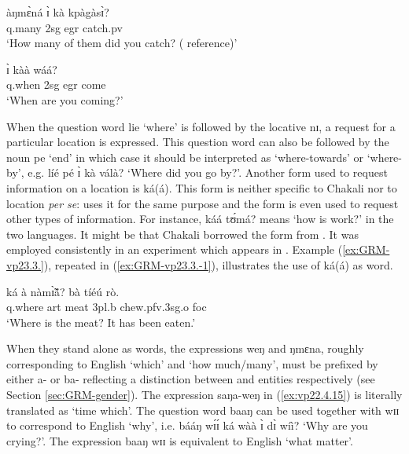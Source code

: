 \begin{exe}
\begin{exe}
\begin{exe}
\begin{exe}
\begin{exe}
\begin{exe}
\begin{exe}
\begin{exe}
\begin{exe}
\ex\label{ex:vp22.4.10}
\gll àŋmɛ̀ná ɪ̀ kà kpàgàsɪ̀?\\
   {\sc q}.many {\sc 2sg}  {\sc  egr}  catch.{\sc pv}\\
\glt  `How many of them did you catch? ( reference)' 

\ex\label{ex:vp22.4.15}
 ɪ̀ kàà wáá?\\
    {\sc q}.when {\sc 2sg} {\sc  egr} come\\
\glt  `When are you coming?' 
  
   
  \z 
 \z

When the question word {\sls lie} `where' is  followed by the locative  {\sls nɪ},  a request for a particular location is expressed. This question word can also be followed by the noun  {\sls pe} `end' in which case it should be interpreted as `where-towards' or `where-by', e.g. {\sls líé pé ɪ̀ kà válà?} `Where did you go by?'.  Another form used to request information on a location is {\sls ká(á)}. This form is neither specific to Chakali nor to location {\it per se}:   uses it for the same purpose and the form is even used to request other types  of information. For instance, {\sls káá tʊ́má?} means `how is work?' in the two languages. It might be that Chakali borrowed the form from .  It was employed consistently in an experiment which appears in \citet{brin11}. Example  (\ref{ex:GRM-vp23.3.}),  repeated in  (\ref{ex:GRM-vp23.3.-1}), illustrates the use of {\sls ká(á)} as  word.

\ea\label{ex:GRM-vp23.3.-1}
\gll ká à nàmɪ̃̀ã́?  bà tíéú rò.\\
   {\sc q}.where {\sc art} meat {\sc 3pl.b} chew.{\sc pfv}.{\sc 3sg.o} {\sc foc}\\
\glt  `Where is the meat? It has been eaten.'
\z

When they stand alone as  words, the expressions {\sls weŋ} and {\sls ŋmɛna}, roughly corresponding to English `which' and `how much/many', must be prefixed by either {\sls a-} or {\sls ba-} reflecting a distinction between  and  entities respectively (see Section \ref{sec:GRM-gender}). The expression {\sls saŋa-weŋ} in (\ref{ex:vp22.4.15}) is literally translated as `time which'.  The question word {\sls baaŋ} can be used together with {\sls wɪɪ} to correspond to English `why', i.e. {\sls bááŋ wɪ́ɪ́ ká wàà ɪ̀ dɪ̀ wíì?}  `Why are you crying?'.  The expression {\sls baaŋ wɪɪ} is equivalent to English `what matter'. 




\end{exe}
\end{exe}
\end{exe}
\end{exe}
\end{exe}
\end{exe}
\end{exe}
\end{exe}
\end{exe}
